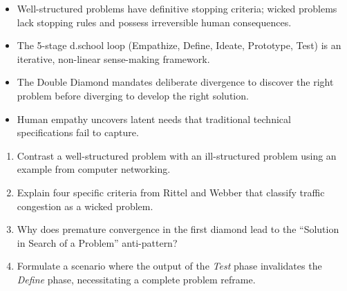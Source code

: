 \begin{quickrevision}
\begin{itemize}
    \item Well-structured problems have definitive stopping criteria; wicked problems lack stopping rules and possess irreversible human consequences.
    \item The 5-stage d.school loop (Empathize, Define, Ideate, Prototype, Test) is an iterative, non-linear sense-making framework.
    \item The Double Diamond mandates deliberate divergence to discover the right problem before diverging to develop the right solution.
    \item Human empathy uncovers latent needs that traditional technical specifications fail to capture.
\end{itemize}
\end{quickrevision}

\begin{practiceset}
\begin{enumerate}[leftmargin=1.5em]
    \item Contrast a well-structured problem with an ill-structured problem using an example from computer networking.
    \item Explain four specific criteria from Rittel and Webber that classify traffic congestion as a wicked problem.
    \item Why does premature convergence in the first diamond lead to the ``Solution in Search of a Problem'' anti-pattern?
    \item Formulate a scenario where the output of the \textit{Test} phase invalidates the \textit{Define} phase, necessitating a complete problem reframe.
\end{enumerate}
\end{practiceset}
